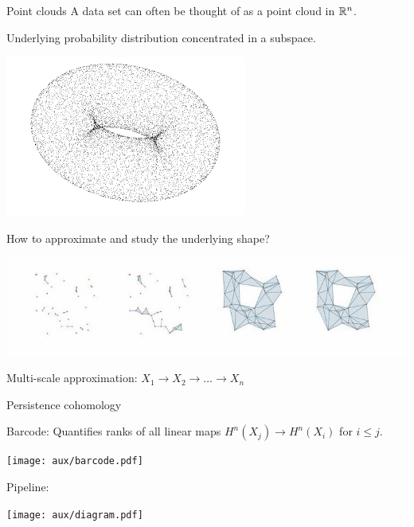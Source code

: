 
\begin{frame}{Point clouds}
	A data set can often be thought of as a point cloud in $\mathbb{R}^n$.

	\vskip 8pt

	Underlying probability distribution concentrated in a subspace.

	\vspace*{-5pt}

	\begin{center}
		\includegraphics[scale=.3]{aux/torus}
	\end{center}

	\vspace*{-10pt} \pause

	How to approximate and study the underlying shape?

	\begin{center}
		\includegraphics[scale=.4]{aux/filtration}
	\end{center}

	\vskip-15pt
	\textcolor{pblue}{Multi-scale approximation:} $X_1 \to X_2 \to \dots \to X_n$
\end{frame}

\begin{frame}{Persistence cohomology}

	\textcolor{pblue}{Barcode:}
	Quantifies ranks of all linear maps $H^n(X_j) \to H^n(X_i)$ for $i \leq j$.

	\pause
	\begin{center}
		\texttt{[image: aux/barcode.pdf]}
	\end{center}

	\pause
	\textcolor{pblue}{Pipeline:}
	\begin{center}
		\texttt{[image: aux/diagram.pdf]}
	\end{center}
\end{frame}


